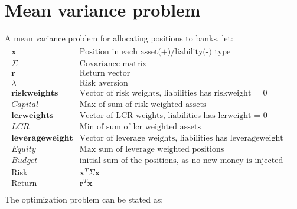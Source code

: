\documentclass[letterpaper,10pt,english]{jupyterBook}
\begin{document}
\section{Mean variance problem}
\label{\detokenize{content/howto/optimization/Optimize_simpel:mean-variance-problem}}
\sphinxAtStartPar
A mean variance problem for allocating positions to banks.
let:
\begin{equation*}
\begin{split}
\begin{array}{ll}
\mathbf x & \mbox{Position in each asset(+)/liability(-) type}\\
\Sigma & \mbox{Covariance matrix} \\
\mathbf r & \mbox{Return vector}\\
\lambda & \mbox{Risk aversion}\\
\mathbf{riskweights}&\text{Vector of risk weights, liabilities has riskweight = 0}\\
Capital&\text{Max of sum of risk weighted assets}\\
\mathbf{lcrweights}&\text{Vector of LCR weights, liabilities has lcrweight = 0}\\
LCR&\text{Min of sum of lcr weighted assets}\\
\mathbf{leverageweight}&\text{Vector of leverage weights, liabilities has leverageweight = 0}\\
Equity&\text{Max sum of leverage weighted positions}\\
Budget&\text{initial sum of the positions, as no new money is injected the sum has to be maintained }\\
\mbox{Risk} & \mathbf x^T  \Sigma \mathbf x\\
\mbox{Return} & \mathbf r^T \mathbf x\\
\end{array}
\end{split}
\end{equation*}
\sphinxAtStartPar
The optimization problem can be stated as:
\end{document}
